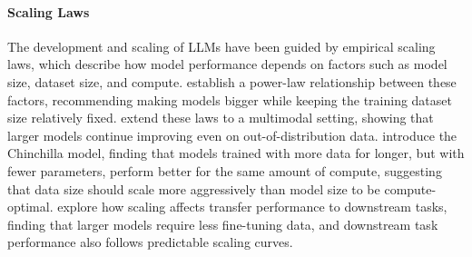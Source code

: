 \paragraph{Scaling Laws}

The development and scaling of LLMs have been guided by empirical scaling laws, which describe how model performance depends on factors such as model size, dataset size, and compute. \citet{kaplan2020scaling} establish a power-law relationship between these factors, recommending making models bigger while keeping the training dataset size relatively fixed. \citet{henighan2020scaling} extend these laws to a multimodal setting, showing that larger models continue improving even on out-of-distribution data. \citet{hoffman2022chinchilla} introduce the Chinchilla model, finding that models trained with more data for longer, but with fewer parameters, perform better for the same amount of compute, suggesting that data size should scale more aggressively than model size to be compute-optimal. \citet{hernandez2021scaling} explore how scaling affects transfer performance to downstream tasks, finding that larger models require less fine-tuning data, and downstream task performance also follows predictable scaling curves.




